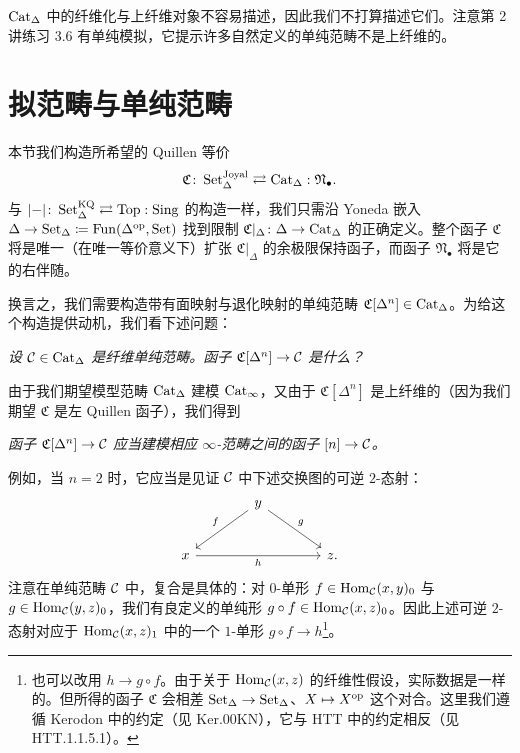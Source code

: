 \begin{remark}\label{L5-5.6}
$\operatorname{Cat}_\Delta$ 中的纤维化与上纤维对象不容易描述，因此我们不打算描述它们。注意第 2 讲练习 3.6 有单纯模拟，它提示许多自然定义的单纯范畴不是上纤维的。
\end{remark}

\section{拟范畴与单纯范畴}

\nitem\label{L5-6.1} 本节我们构造所希望的 Quillen 等价
\[
\mathfrak{C}\colon\operatorname{Set}^{\mathrm{Joyal}}_\Delta\rightleftarrows\operatorname{Cat}_\Delta:\mathfrak{N}_{\bullet}.
\]
与 $|{-}|\colon\operatorname{Set}^{\mathrm{KQ}}_\Delta\rightleftarrows\operatorname{Top}:\operatorname{Sing}$ 的构造一样，我们只需沿 Yoneda 嵌入 $\Delta\to\operatorname{Set}_\Delta\coloneqq\operatorname{Fun}(\Delta^{\mathrm{op}},\operatorname{Set})$ 找到限制 $\mathfrak{C}|_\Delta\colon\Delta\to\operatorname{Cat}_\Delta$ 的正确定义。整个函子 $\mathfrak{C}$ 将是唯一（在唯一等价意义下）扩张 $\mathfrak{C}|_\Delta$ 的余极限保持函子，而函子 $\mathfrak{N}_{\bullet}$ 将是它的右伴随。

\nitem\label{L5-6.2} 换言之，我们需要构造带有面映射与退化映射的单纯范畴 $\mathfrak{C}[\Delta^n]\in\operatorname{Cat}_\Delta$。为给这个构造提供动机，我们看下述问题：
\begin{center}
\emph{设 $\mathcal{C}\in\operatorname{Cat}_\Delta$ 是纤维单纯范畴。函子 $\mathfrak{C}[\Delta^n]\to\mathcal{C}$ 是什么？}
\end{center}
由于我们期望模型范畴 $\operatorname{Cat}_\Delta$ 建模 $\operatorname{Cat}_\infty$，又由于 $\mathfrak{C}[\Delta^n]$ 是上纤维的（因为我们期望 $\mathfrak{C}$ 是左 Quillen 函子），我们得到
\begin{center}
\emph{函子 $\mathfrak{C}[\Delta^n]\to\mathcal{C}$ 应当建模相应 $\infty$-范畴之间的函子 $[n]\to\mathcal{C}$。}
\end{center}

\nitem\label{L5-6.3} 例如，当 $n=2$ 时，它应当是见证 $\mathcal{C}$ 中下述交换图的可逆 $2$-态射：
\[
\begin{tikzcd}[column sep=3.8em,row sep=2.4em]
& y \arrow[dl, "f"'] \arrow[dr, "g"] & \\
x \arrow[rr, "h"'] & & z.
\end{tikzcd}
\]
注意在单纯范畴 $\mathcal{C}$ 中，复合是具体的：对 $0$-单形 $f\in\operatorname{Hom}_{\mathcal{C}}(x,y)_0$ 与 $g\in\operatorname{Hom}_{\mathcal{C}}(y,z)_0$，我们有良定义的单纯形 $g\circ f\in\operatorname{Hom}_{\mathcal{C}}(x,z)_0$。因此上述可逆 $2$-态射对应于 $\operatorname{Hom}_{\mathcal{C}}(x,z)_1$ 中的一个 $1$-单形 $g\circ f\to h$\footnote{也可以改用 $h\to g\circ f$。由于关于 $\operatorname{Hom}_{\mathcal{C}}(x,z)$ 的纤维性假设，实际数据是一样的。但所得的函子 $\mathfrak{C}$ 会相差 $\operatorname{Set}_\Delta\to\operatorname{Set}_\Delta$、$X\mapsto X^{\mathrm{op}}$ 这个对合。这里我们遵循 Kerodon 中的约定（见 Ker.00KN），它与 HTT 中的约定相反（见 HTT.1.1.5.1）。}。

